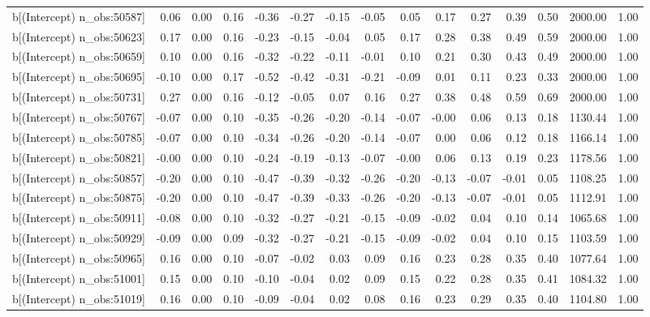 \begin{table}[ht]
\begin{tabular}{rrrrrrrrrrrrrrr}
  b[(Intercept) n\_obs:50587] & 0.06 & 0.00 & 0.16 & -0.36 & -0.27 & -0.15 & -0.05 & 0.05 & 0.17 & 0.27 & 0.39 & 0.50 & 2000.00 & 1.00 \\ 
  b[(Intercept) n\_obs:50623] & 0.17 & 0.00 & 0.16 & -0.23 & -0.15 & -0.04 & 0.05 & 0.17 & 0.28 & 0.38 & 0.49 & 0.59 & 2000.00 & 1.00 \\ 
  b[(Intercept) n\_obs:50659] & 0.10 & 0.00 & 0.16 & -0.32 & -0.22 & -0.11 & -0.01 & 0.10 & 0.21 & 0.30 & 0.43 & 0.49 & 2000.00 & 1.00 \\ 
  b[(Intercept) n\_obs:50695] & -0.10 & 0.00 & 0.17 & -0.52 & -0.42 & -0.31 & -0.21 & -0.09 & 0.01 & 0.11 & 0.23 & 0.33 & 2000.00 & 1.00 \\ 
  b[(Intercept) n\_obs:50731] & 0.27 & 0.00 & 0.16 & -0.12 & -0.05 & 0.07 & 0.16 & 0.27 & 0.38 & 0.48 & 0.59 & 0.69 & 2000.00 & 1.00 \\ 
  b[(Intercept) n\_obs:50767] & -0.07 & 0.00 & 0.10 & -0.35 & -0.26 & -0.20 & -0.14 & -0.07 & -0.00 & 0.06 & 0.13 & 0.18 & 1130.44 & 1.00 \\ 
  b[(Intercept) n\_obs:50785] & -0.07 & 0.00 & 0.10 & -0.34 & -0.26 & -0.20 & -0.14 & -0.07 & 0.00 & 0.06 & 0.12 & 0.18 & 1166.14 & 1.00 \\ 
  b[(Intercept) n\_obs:50821] & -0.00 & 0.00 & 0.10 & -0.24 & -0.19 & -0.13 & -0.07 & -0.00 & 0.06 & 0.13 & 0.19 & 0.23 & 1178.56 & 1.00 \\ 
  b[(Intercept) n\_obs:50857] & -0.20 & 0.00 & 0.10 & -0.47 & -0.39 & -0.32 & -0.26 & -0.20 & -0.13 & -0.07 & -0.01 & 0.05 & 1108.25 & 1.00 \\ 
  b[(Intercept) n\_obs:50875] & -0.20 & 0.00 & 0.10 & -0.47 & -0.39 & -0.33 & -0.26 & -0.20 & -0.13 & -0.07 & -0.01 & 0.05 & 1112.91 & 1.00 \\ 
  b[(Intercept) n\_obs:50911] & -0.08 & 0.00 & 0.10 & -0.32 & -0.27 & -0.21 & -0.15 & -0.09 & -0.02 & 0.04 & 0.10 & 0.14 & 1065.68 & 1.00 \\ 
  b[(Intercept) n\_obs:50929] & -0.09 & 0.00 & 0.09 & -0.32 & -0.27 & -0.21 & -0.15 & -0.09 & -0.02 & 0.04 & 0.10 & 0.15 & 1103.59 & 1.00 \\ 
  b[(Intercept) n\_obs:50965] & 0.16 & 0.00 & 0.10 & -0.07 & -0.02 & 0.03 & 0.09 & 0.16 & 0.23 & 0.28 & 0.35 & 0.40 & 1077.64 & 1.00 \\ 
  b[(Intercept) n\_obs:51001] & 0.15 & 0.00 & 0.10 & -0.10 & -0.04 & 0.02 & 0.09 & 0.15 & 0.22 & 0.28 & 0.35 & 0.41 & 1084.32 & 1.00 \\ 
  b[(Intercept) n\_obs:51019] & 0.16 & 0.00 & 0.10 & -0.09 & -0.04 & 0.02 & 0.08 & 0.16 & 0.23 & 0.29 & 0.35 & 0.40 & 1104.80 & 1.00 \\ 

\end{tabular}
\end{table}
